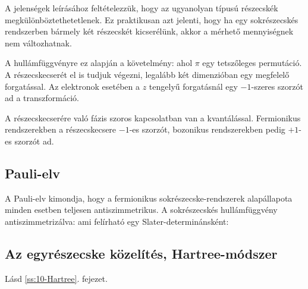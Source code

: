    A jelenségek leírásához feltételezzük, hogy az ugyanolyan típusú részecskék megkülönböztethetetlenek. Ez praktikusan azt jelenti, hogy ha egy sokrészecskés rendszerben bármely két részecskét kicserélünk, akkor a mérhető mennyiségnek nem változhatnak. 
   
   A hullámfüggvényre ez alapján a követelmény:
   ahol $\pi$ egy tetszőleges permutáció. A részecskecserét el is tudjuk végezni, legalább két dimenzióban egy megfelelő forgatással. Az elektronok esetében a $z$ tengelyű forgatásnál egy $-1$-szeres szorzót ad a transzformáció. 
   
   A részecskecserére való fázis szoros kapcsolatban van a kvantálással. Fermionikus rendszerekben a részecskecsere $-1$-es szorzót, bozonikus rendszerekben pedig $+1$-es szorzót ad.
   
  \subsection{Pauli-elv}
   
   A Pauli-elv kimondja, hogy a fermionikus sokrészecske-rendszerek alapállapota minden esetben teljesen antiszimmetrikus. A sokrészecskés hullámfüggvény antiszimmetrizálva:
   ami felírható egy Slater-determinánsként:
   
  \subsection{Az egyrészecske közelítés, Hartree-módszer}
   
   Lásd \ref{ss:10-Hartree}. fejezet. 
   
   
   